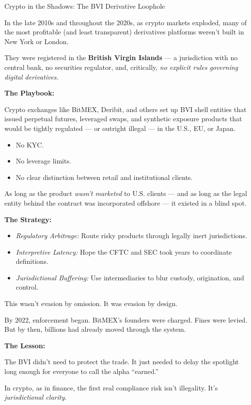 \begin{HistoricalSidebar}{Crypto in the Shadows: The BVI Derivative Loophole}

  In the late 2010s and throughout the 2020s, as crypto markets exploded,  
  many of the most profitable (and least transparent) derivatives platforms  
  weren’t built in New York or London.
  
  They were registered in the \textbf{British Virgin Islands} —  
  a jurisdiction with no central bank, no securities regulator,  
  and, critically, \textit{no explicit rules governing digital derivatives.}
  
  \medskip
  
  \textbf{The Playbook:}
  
  Crypto exchanges like BitMEX, Deribit, and others set up BVI shell entities  
  that issued perpetual futures, leveraged swaps, and synthetic exposure products  
  that would be tightly regulated — or outright illegal — in the U.S., EU, or Japan.
  
  \begin{itemize}
    \item No KYC.  
    \item No leverage limits.  
    \item No clear distinction between retail and institutional clients.
  \end{itemize}
  
  \medskip
  
  As long as the product \textit{wasn’t marketed} to U.S. clients — and as long as  
  the legal entity behind the contract was incorporated offshore —  
  it existed in a blind spot.
  
  \medskip
  
  \textbf{The Strategy:}  
  \begin{itemize}
    \item \textit{Regulatory Arbitrage:} Route risky products through legally inert jurisdictions.  
    \item \textit{Interpretive Latency:} Hope the CFTC and SEC took years to coordinate definitions.  
    \item \textit{Jurisdictional Buffering:} Use intermediaries to blur custody, origination, and control.
  \end{itemize}
  
  \medskip
  
  This wasn’t evasion by omission.  
  It was evasion by design.
  
  By 2022, enforcement began.  
  BitMEX’s founders were charged. Fines were levied.  
  But by then, billions had already moved through the system.
  
  \medskip
  
  \textbf{The Lesson:}
  
  The BVI didn’t need to protect the trade.  
  It just needed to delay the spotlight long enough for  
  everyone to call the alpha “earned.”
  
  In crypto, as in finance, the first real compliance risk isn’t illegality.  
  It’s \textit{jurisdictional clarity}.
  
\end{HistoricalSidebar}
  
